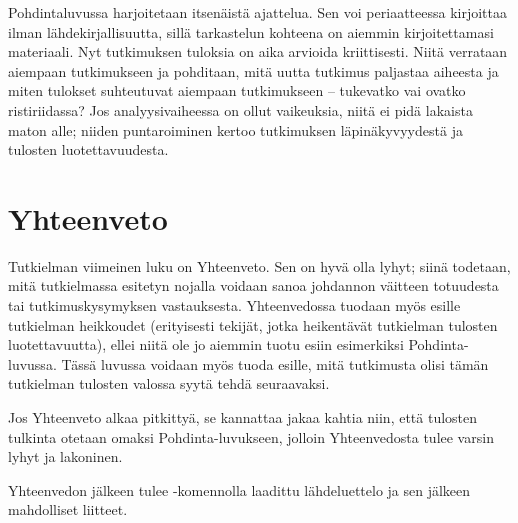 \documentclass[utf8]{gradu3}
\begin{document}
Pohdintaluvussa harjoitetaan itsenäistä ajattelua. Sen voi periaatteessa kirjoittaa ilman lähdekirjallisuutta, sillä tarkastelun kohteena on aiemmin kirjoitettamasi materiaali. Nyt tutkimuksen tuloksia on aika arvioida kriittisesti. Niitä verrataan aiempaan tutkimukseen ja pohditaan, mitä uutta tutkimus paljastaa aiheesta ja miten tulokset suhteutuvat aiempaan tutkimukseen – tukevatko vai ovatko ristiriidassa? Jos analyysivaiheessa on ollut vaikeuksia, niitä ei pidä lakaista maton alle; niiden puntaroiminen kertoo tutkimuksen läpinäkyvyydestä ja tulosten luotettavuudesta. 

\chapter{Yhteenveto}

Tutkielman viimeinen luku on Yhteenveto.  Sen on hyvä olla lyhyt; siinä todetaan, mitä tutkielmassa esitetyn nojalla voidaan sanoa johdannon väitteen totuudesta tai tutkimuskysymyksen vastauksesta. Yhteenvedossa tuodaan myös esille tutkielman heikkoudet (erityisesti tekijät, jotka heikentävät tutkielman tulosten luotettavuutta), ellei niitä ole jo aiemmin tuotu esiin esimerkiksi Pohdinta-luvussa. Tässä luvussa voidaan myös tuoda esille, mitä tutkimusta olisi tämän
tutkielman tulosten valossa syytä tehdä seuraavaksi.

Jos Yhteenveto alkaa pitkittyä, se kannattaa jakaa kahtia niin, että tulosten tulkinta otetaan omaksi Pohdinta-luvukseen, jolloin Yhteenvedosta tulee varsin lyhyt ja lakoninen.

Yhteenvedon jälkeen tulee \string\printbibliography-komennolla laadittu lähdeluettelo ja sen jälkeen mahdolliset liitteet.


\printbibliography

%

\appendix
\end{document}
